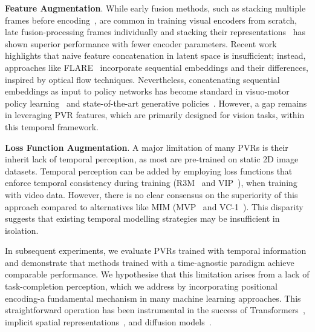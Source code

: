 \textbf{Feature Augmentation}. While early fusion methods, such as stacking multiple frames before encoding~\cite{Karpathy_2014_CVPR}, are common in training visual encoders from scratch, late fusion-processing frames individually and stacking their representations~\cite{NIPS2017_3f5ee243} has shown superior performance with fewer encoder parameters. 
Recent work~\cite{NEURIPS2021_ba3c5fe1} highlights that naive feature concatenation in latent space is insufficient; instead, approaches like FLARE~\cite{NEURIPS2021_ba3c5fe1} incorporate sequential embeddings and their differences, inspired by optical flow techniques. 
Nevertheless, concatenating sequential embeddings as input to policy networks has become standard in visuo-motor policy learning~\cite{parisi2022unsurprising} and state-of-the-art generative policies~\cite{chi2023diffusionpolicy}. 
However, a gap remains in leveraging PVR features, which are primarily designed for vision tasks, within this temporal framework.

\textbf{Loss Function Augmentation}. A major limitation of many PVRs is their inherit lack of temporal perception, as most are pre-trained on static 2D image datasets. 
Temporal perception can be added by employing loss functions that enforce temporal consistency during training (\eg R3M~\cite{nair2022rm} and VIP~\cite{ma2022vip}), when training with video data.  
However, there is no clear consensus on the superiority of this approach compared to alternatives like MIM (\eg MVP~\cite{Xiao2022, hu2023pretrainedvisionmodelsmotor} and VC-1~\cite{NEURIPS2023_022ca1be}). 
This disparity suggests that existing temporal modelling strategies may be insufficient in isolation. 

In subsequent experiments, we evaluate PVRs trained with temporal information and demonstrate that methods trained with a time-agnostic paradigm achieve comparable performance.
We hypothesise that this limitation arises from a lack of task-completion perception, which we address by incorporating positional encoding-a fundamental mechanism in many machine learning approaches.
This straightforward operation has been instrumental in the success of Transformers~\cite{NIPS2017_3f5ee243}, implicit spatial representations~\cite{mildenhall2020nerf}, and diffusion models~\cite{ho2020denoising}.

